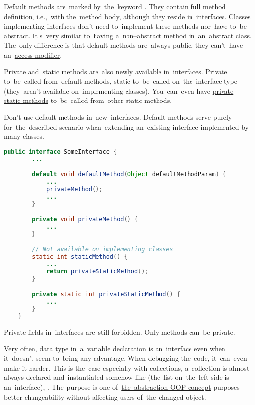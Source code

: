 Default methods are~marked by~the~keyword .
They contain full method \hyperref[declarationdefinition]{definition}, i.e.,~with the~method body, although they reside in~interfaces.
Classes implementing interfaces don't need to~implement these methods nor~have to~be abstract.
It's~very similar to~having a~non--abstract method in~an~\hyperref[javaabstractclasses]{abstract class}.
The~only difference is that default methods are~always public, they can't~have an~\hyperref[javaaccessmodifiers]{access modifier}.

\hyperref[javaprivate]{Private} and~\hyperref[javastatic]{static} methods are~also newly available in~interfaces.
Private to~be~called from~default methods, static to~be~called on~the~interface type (they~aren't available on~implementing classes).
You~can~even have \hyperref[javaprivatestaticmethods]{private static methods} to~be~called from~other static methods.

\warning Don't use default methods in~new~interfaces.
Default methods serve purely for~the~described scenario when~extending an~existing interface implemented by many classes.

\begin{lstlisting}[language=Java]
    public interface SomeInterface {
        ...

        default void defaultMethod(Object defaultMethodParam) {
            ...
            privateMethod();
            ...
        }

        private void privateMethod() {
            ...
        }

        // Not available on implementing classes
        static int staticMethod() {
            ...
            return privateStaticMethod();
        }

        private static int privateStaticMethod() {
            ...
        }
    }
\end{lstlisting}

\notenonl Private fields in~interfaces are~still forbidden.
Only methods can~be private.
\newpage

Very often, \hyperref[datatypes]{data type} in~a~variable \hyperref[declarationdefinition]{declaration} is an~interface even when it~doesn't seem to~bring any advantage.
When debugging the~code, it~can~even make it harder.
This is the~case especially with collections, a~collection is almost always declared and~instantiated somehow like  (the~list on~the~left side is an~interface), .
The~purpose is one of~\hyperref[abstraction]{the~abstraction OOP concept} purposes -- better changeability without affecting users of~the~changed object.

